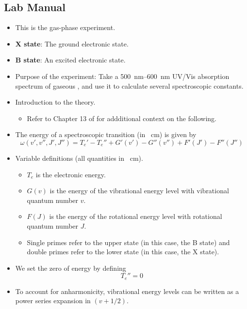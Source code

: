 \documentclass[../notes.tex]{subfiles}
\begin{document}
\subsection*{Lab Manual}
\begin{itemize}
    \item This is the gas-phase experiment.
    \item \textbf{X state}: The ground electronic state.
    \item \textbf{B state}: An excited electronic state.
    \item Purpose of the experiment: Take a \SIrange{500}{600}{\nano\meter} UV/Vis absorption spectrum of gaseous , and use it to calculate several spectroscopic constants.
    \item Introduction to the theory.
    \begin{itemize}
        \item Refer to Chapter 13 of \textcite{bib:McQuarrieSimon} for addditional context on the following.
    \end{itemize}
    \item The energy of a spectroscopic transition (in \si{\per\centi\meter}) is given by
    \begin{equation*}
        \omega(v',v'',J',J'') = T_e'-T_e''+G'(v')-G''(v'')+F'(J')-F''(J'')
    \end{equation*}
    \item Variable definitions (all quantities in \si{\per\centi\meter}).
    \begin{itemize}
        \item $T_e$ is the electronic energy.
        \item $G(v)$ is the energy of the vibrational energy level with vibrational quantum number $v$.
        \item $F(J)$ is the energy of the rotational energy level with rotational quantum number $J$.
        \item Single primes refer to the upper state (in this case, the B state) and double primes refer to the lower state (in this case, the X state).
    \end{itemize}
    \item We set the zero of energy by defining
    \begin{equation*}
        T_e'' = 0
    \end{equation*}
    \item To account for anharmonicity, vibrational energy levels can be written as a power series expansion in $(v+1/2)$.
    \begin{equation*}

\end{equation*}
\end{itemize}
\end{document}
